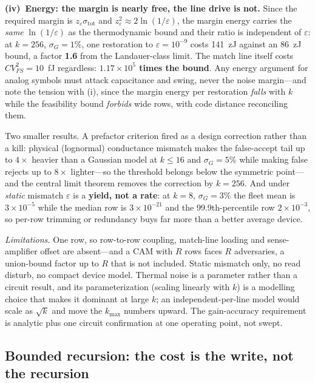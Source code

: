 \documentclass[11pt]{article}
\begin{document}
\textbf{(iv)~Energy: the margin is nearly free, the line drive is not.} Since the required margin is $z_\varepsilon\sigma_{\mathrm{tot}}$ and $z_\varepsilon^2 \approx 2\ln(1/\varepsilon)$, the margin energy carries the \textit{same} $\ln(1/\varepsilon)$ as the thermodynamic bound and their ratio is independent of $\varepsilon$: at $k=256$, $\sigma_G=1\%$, one restoration to $\varepsilon = 10^{-9}$ costs 141~zJ against an 86~zJ bound, a factor \textbf{1.6} from the Landauer-class limit. The match line itself costs $CV_{FS}^2 = 10$~fJ regardless: \textbf{$1.17\times10^{5}$ times the bound}. Any energy argument for analog symbols must attack capacitance and swing, never the noise margin---and note the tension with (i), since the margin energy per restoration \textit{falls} with $k$ while the feasibility bound \textit{forbids} wide rows, with code distance reconciling them.

Two smaller results. A prefactor criterion fired as a design correction rather than a kill: physical (lognormal) conductance mismatch makes the false-accept tail up to $4\times$ heavier than a Gaussian model at $k\le16$ and $\sigma_G = 5\%$ while making false rejects up to $8\times$ lighter---so the threshold belongs below the symmetric point---and the central limit theorem removes the correction by $k=256$. And under \textit{static} mismatch $\varepsilon$ is a \textbf{yield, not a rate}: at $k=8$, $\sigma_G=3\%$ the fleet mean is $3\times10^{-5}$ while the median row is $3\times10^{-21}$ and the 99.9th-percentile row $2\times10^{-3}$, so per-row trimming or redundancy buys far more than a better average device.

\textit{Limitations.} One row, so row-to-row coupling, match-line loading and sense-amplifier offset are absent---and a CAM with $R$ rows faces $R$ adversaries, a union-bound factor up to $R$ that is not included. Static mismatch only, no read disturb, no compact device model. Thermal noise is a parameter rather than a circuit result, and its parameterization (scaling linearly with $k$) is a modelling choice that makes it dominant at large $k$; an independent-per-line model would scale as $\sqrt k$ and move the $k_{\max}$ numbers upward. The gain-accuracy requirement is analytic plus one circuit confirmation at one operating point, not swept.

\subsection{Bounded recursion: the cost is the write, not the recursion}
\label{sec:recursion}
\end{document}
